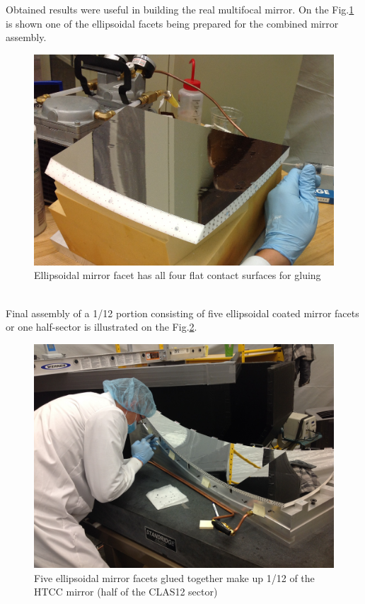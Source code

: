 \indent Obtained results were useful in building the real multifocal mirror. On the Fig.\ref{fig:facet} is shown one of the ellipsoidal facets being prepared for the combined mirror assembly.
\begin{figure}[h]
    \centering
    \includegraphics[width=1.0\linewidth]{Picture2.png}
    \caption{Ellipsoidal mirror facet has all four flat contact surfaces for gluing}
    \label{fig:facet}
\end{figure}{}
\\
\indent Final assembly of a 1/12 portion consisting of five ellipsoidal coated mirror facets or one half-sector is illustrated on the Fig.\ref{fig:one_sector}.

\begin{figure}[h]
    \centering
    \includegraphics[trim={20cm 15cm 0 10cm },clip,width=\linewidth]{Picture3.JPG}
    \caption{Five ellipsoidal mirror facets glued together make up 1/12 of the HTCC mirror (half of the CLAS12 sector)}
    \label{fig:one_sector}
\end{figure}{}

